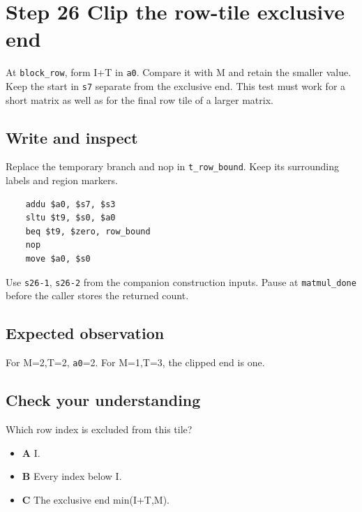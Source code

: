 \section{Step 26 Clip the row-tile exclusive end}\label{matmul-s26}

At \texttt{block\_row}, form I+T in \texttt{a0}. Compare it with M and retain the smaller value. Keep the start in \texttt{s7} separate from the exclusive end. This test must work for a short matrix as well as for the final row tile of a larger matrix.

\subsection{Write and inspect}
Replace the temporary branch and nop in \texttt{t\_row\_bound}. Keep its surrounding labels and region markers.

\begin{verbatim}
    addu $a0, $s7, $s3
    sltu $t9, $s0, $a0
    beq $t9, $zero, row_bound
    nop
    move $a0, $s0
\end{verbatim}
Use \texttt{s26-1}, \texttt{s26-2} from the companion construction inputs. Pause at \texttt{matmul\_done} before the caller stores the returned count.

\subsection{Expected observation}
For M=2,T=2, \texttt{a0}=2. For M=1,T=3, the clipped end is one.

\subsection{Check your understanding}
Which row index is excluded from this tile?

\begin{itemize}
  \item \textbf{A} I.
  \item \textbf{B} Every index below I.
  \item \textbf{C} The exclusive end min(I+T,M).
\end{itemize}

